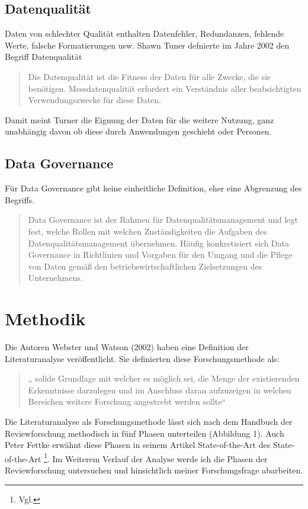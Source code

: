 \documentclass[12pt,a4paper,bibliography=totocnumbered,listof=totocnumbered]{scrartcl}
\begin{document}
\subsection*{Datenqualität}
Daten von schlechter Qualität enthalten Datenfehler, 
Redundanzen, fehlende Werte, falsche Formatierungen usw.
Shawn Tuner defnierte im Jahre 2002 den Begriff Datenqualität
\begin{quote}
Die Datenqualität ist die Fitness der Daten für alle Zwecke, die sie benötigen. Messdatenqualität erfordert ein Verständnis aller beabsichtigten Verwendungszwecke für diese Daten. \cite{turner}
\end{quote}
Damit meint Turner die Eignung der Daten für die weitere Nutzung, ganz unabhängig davon ob diese durch Anwendungen geschieht oder Personen. 
\subsection*{Data Governance}
Für Data Governance gibt keine einheitliche Definition, eher eine Abgrenzung des Begriffs. 
\begin{quote}
Data Governance ist der Rahmen für Datenqualitätsmanagement und legt fest, welche Rollen mit welchen Zuständigkeiten die Aufgaben des Datenqualitätsmanagement übernehmen.
Häufig konkretisiert sich Data Governance in Richtlinien und Vorgaben für den Umgang und die Pflege von Daten gemäß den betriebswirtschaftlichen Zielsetzungen des Unternehmens.\cite{hildebrand2008daten}
\end{quote}

\newpage

\section{Methodik}
Die Autoren Webster und Watson (2002) haben eine Definition der Literaturanalyse veröffentlicht. Sie definierten diese
Forschungsmethode als:\begin{quote} „ solide Grundlage mit welcher es möglich sei, die Menge der existierenden Erkenntnisse darzulegen und im Anschluss daran aufzuzeigen in welchen Bereichen weitere Forschung angestrebt werden sollte“  \cite{webster2002analyzing}\end{quote}
Die Literaturanalyse als Forschungsmethode lässt sich nach dem Handbuch der Reviewforschung \cite{hedges1993research} methodisch in fünf Phasen unterteilen (Abbildung 1). Auch Peter Fettke  erwähnt diese Phasen in seinem Artikel State-of-the-Art des State-of-the-Art \footnote{Vgl.\cite{fettke2006state}}. Im Weiterem Verlauf der Analyse werde ich die Phasen der Reviewforschung untersuchen und hinsichtlich meiner Forschungsfrage abarbeiten. 
\end{document}
